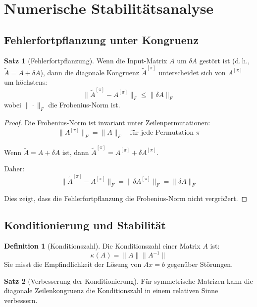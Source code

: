\documentclass[a4paper,12pt]{article}
\theoremstyle{definition}
\newtheorem{definition}{Definition}
\newtheorem{satz}{Satz}
\begin{document}
\section{Numerische Stabilitätsanalyse}

\subsection{Fehlerfortpflanzung unter Kongruenz}

\begin{satz}[Fehlerfortpflanzung]
	\label{satz:fehler}
	Wenn die Input-Matrix $A$ um $\delta A$ gestört ist (d.\,h., $\tilde{A} = A + \delta A$), dann die diagonale Kongruenz $\tilde{A}^{[\pi]}$ unterscheidet sich von $A^{[\pi]}$ um höchstens:
	\[
	\|\tilde{A}^{[\pi]} - A^{[\pi]}\|_F \leq \|\delta A\|_F
	\]
	wobei $\|\cdot\|_F$ die Frobenius-Norm ist.
\end{satz}

\begin{proof}
	Die Frobenius-Norm ist invariant unter Zeilenpermutationen:
	\[
	\|A^{[\pi]}\|_F = \|A\|_F \quad \text{für jede Permutation } \pi
	\]
	
	Wenn $\tilde{A} = A + \delta A$ ist, dann $\tilde{A}^{[\pi]} = A^{[\pi]} + \delta A^{[\pi]}$.
	
	Daher:
	\[
	\|\tilde{A}^{[\pi]} - A^{[\pi]}\|_F = \|\delta A^{[\pi]}\|_F = \|\delta A\|_F
	\]
	
	Dies zeigt, dass die Fehlerfortpflanzung die Frobenius-Norm nicht vergrößert.
\end{proof}

\subsection{Konditionierung und Stabilität}

\begin{definition}[Konditionszahl]
	Die Konditionszahl einer Matrix $A$ ist:
	\[
	\kappa(A) = \|A\| \|A^{-1}\|
	\]
	Sie misst die Empfindlichkeit der Lösung von $Ax = b$ gegenüber Störungen.
\end{definition}

\begin{satz}[Verbesserung der Konditionierung]
	\label{satz:kondition-verbessert}
	Für symmetrische Matrizen kann die diagonale Zeilenkongruenz die Konditionszahl in einem relativen Sinne verbessern.
\end{satz}
\end{document}
